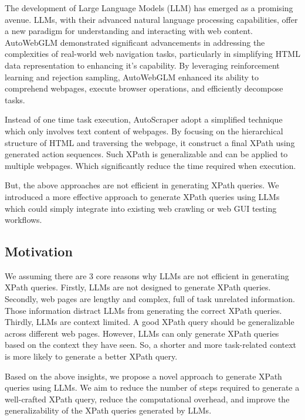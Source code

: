 \documentclass[a4paper]{article}
\begin{document}
The development of Large Language Models (LLM) has emerged as a promising avenue. LLMs, with their advanced natural language processing capabilities, offer a new paradigm for understanding and interacting with web content. AutoWebGLM\cite{lai2024autowebglmlargelanguagemodelbased} demonstrated significant advancements in addressing the complexities of real-world web navigation tasks, particularly in simplifying HTML data representation to enhancing it's capability. By leveraging reinforcement learning and rejection sampling, AutoWebGLM enhanced its ability to comprehend webpages, execute browser operations, and efficiently decompose tasks.

Instead of one time task execution, AutoScraper\cite{huang2024autoscraperprogressiveunderstandingweb} adopt a simplified technique which only involves text content of webpages. By focusing on the hierarchical structure of HTML and traversing the webpage, it construct a final XPath using generated action sequences. Such XPath is generalizable and can be applied to multiple webpages. Which significantly reduce the time required when execution.

But, the above approaches are not efficient in generating XPath queries. We introduced a more effective approach to generate XPath queries using LLMs which could simply integrate into existing web crawling or web GUI testing workflows. 

\subsection{Motivation}

We assuming there are 3 core reasons why LLMs are not efficient in generating XPath queries. Firstly, LLMs are not designed to generate XPath queries. Secondly, web pages are lengthy and complex, full of task unrelated information. Those information distract LLMs from generating the correct XPath queries. Thirdly, LLMs are context limited. A good XPath query should be generalizable across different web pages. However, LLMs can only generate XPath queries based on the context they have seen. So, a shorter and more task-related context is more likely to generate a better XPath query.

Based on the above insights, we propose a novel approach to generate XPath queries using LLMs. We aim to reduce the number of steps required to generate a well-crafted XPath query, reduce the computational overhead, and improve the generalizability of the XPath queries generated by LLMs.
\end{document}
